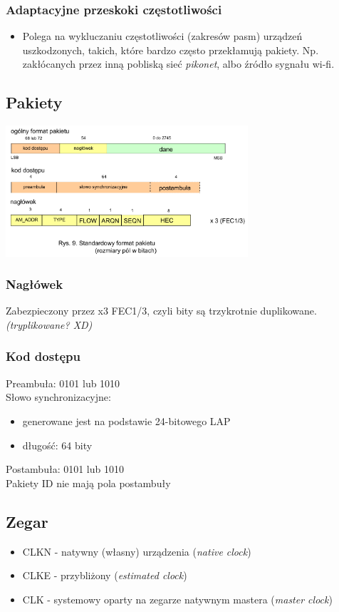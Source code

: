 \subsubsection{Adaptacyjne przeskoki częstotliwości}
\begin{itemize}
	\item Polega na wykluczaniu częstotliwości (zakresów pasm) urządzeń uszkodzonych, takich, które bardzo często przekłamują pakiety. Np. zakłócanych przez inną pobliską sieć \textit{pikonet}, albo źródło sygnału wi-fi.
\end{itemize}

\subsection{Pakiety}
\includegraphics[width=9cm]{./wyklady/Rysunek05.pdf}
\subsubsection{Nagłówek}
Zabezpieczony przez x3 FEC1/3, czyli bity są trzykrotnie duplikowane. \textit{(tryplikowane? XD)}\\
\subsubsection{Kod dostępu}
Preambuła: 0101 lub 1010\\
Słowo synchronizacyjne:
\begin{itemize}
	\item generowane jest na podstawie 24-bitowego LAP
	\item długość: 64 bity
\end{itemize}
Postambuła: 0101 lub 1010\\
Pakiety ID nie mają pola postambuły

\subsection{Zegar}
\begin{itemize}
	\item CLKN - natywny (własny) urządzenia (\emph{native clock})
	\item CLKE - przybliżony (\emph{estimated clock})
	\item CLK - systemowy oparty na zegarze natywnym mastera (\emph{master clock})
\end{itemize}

